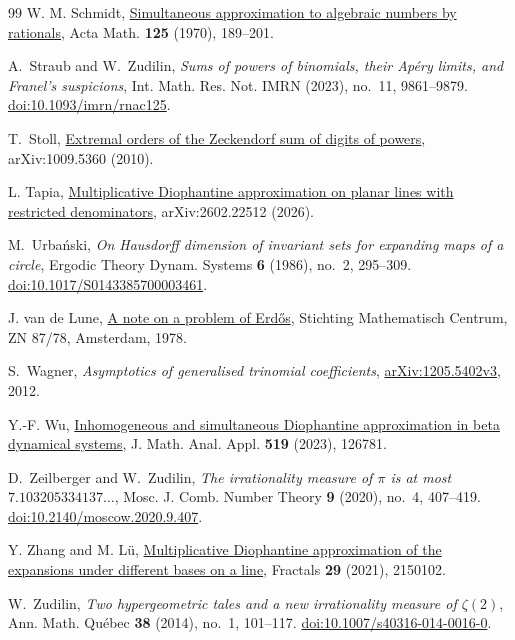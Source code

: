 \documentclass[11pt,reqno,a4paper]{amsart}
\theoremstyle{remark}
\begin{document}
\begin{thebibliography}{99}
W. M. Schmidt, \href{https://doi.org/10.1007/BF02392334}{Simultaneous approximation to algebraic numbers by rationals}, Acta Math. \textbf{125} (1970), 189--201.

A.~Straub and W.~Zudilin, \emph{Sums of powers of binomials, their
Ap\'ery limits, and Franel's suspicions}, Int. Math. Res. Not. IMRN
(2023), no.~11, 9861--9879.
\href{https://doi.org/10.1093/imrn/rnac125}{doi:10.1093/imrn/rnac125}.

T.~Stoll,
\href{https://arxiv.org/abs/1009.5360}{Extremal orders of the Zeckendorf sum of digits of powers},
arXiv:1009.5360 (2010).

L. Tapia,
\href{https://arxiv.org/abs/2602.22512}{Multiplicative Diophantine approximation on planar lines with restricted denominators},
arXiv:2602.22512 (2026).

M.~Urba\'nski, \emph{On Hausdorff dimension of invariant sets for
expanding maps of a circle}, Ergodic Theory Dynam. Systems \textbf{6}
(1986), no.~2, 295--309.
\href{https://doi.org/10.1017/S0143385700003461}{doi:10.1017/S0143385700003461}.

J. van de Lune,
\href{https://ir.cwi.nl/pub/7417/}{A note on a problem of Erd\H{o}s},
Stichting Mathematisch Centrum, ZN 87/78, Amsterdam, 1978.

S.~Wagner, \emph{Asymptotics of generalised trinomial coefficients},
\href{https://arxiv.org/abs/1205.5402v3}{arXiv:1205.5402v3}, 2012.

Y.-F. Wu,
\href{https://doi.org/10.1016/j.jmaa.2022.126781}{Inhomogeneous and simultaneous Diophantine approximation in beta dynamical systems},
J. Math. Anal. Appl. \textbf{519} (2023), 126781.

D.~Zeilberger and W.~Zudilin, \emph{The irrationality measure of
\(\pi\) is at most \(7.103205334137\ldots\)}, Mosc. J. Comb. Number
Theory \textbf{9} (2020), no.~4, 407--419.
\href{https://doi.org/10.2140/moscow.2020.9.407}{doi:10.2140/moscow.2020.9.407}.

Y. Zhang and M. L\"u,
\href{https://doi.org/10.1142/S0218348X21501024}{Multiplicative Diophantine approximation of the expansions under different bases on a line},
Fractals \textbf{29} (2021), 2150102.

W.~Zudilin, \emph{Two hypergeometric tales and a new irrationality
measure of \(\zeta(2)\)}, Ann. Math. Qu\'ebec \textbf{38} (2014),
no.~1, 101--117.
\href{https://doi.org/10.1007/s40316-014-0016-0}{doi:10.1007/s40316-014-0016-0}.
\end{thebibliography}
\end{document}

